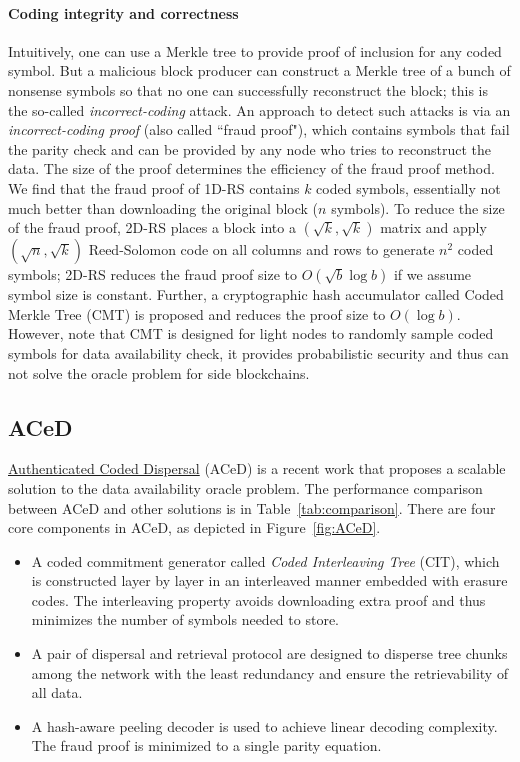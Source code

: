 \documentclass{article}
\begin{document}
\paragraph{Coding integrity and correctness} Intuitively, one can use a Merkle tree to provide proof of inclusion for any coded symbol. But a malicious block producer can construct a Merkle tree of a bunch of nonsense symbols so that no one can successfully reconstruct the block; this is the so-called {\em incorrect-coding} attack. An approach to detect such attacks is via an {\em incorrect-coding proof} (also called ``fraud proof"), which contains symbols that fail the parity check and can be provided by any node who tries to reconstruct the data.  The size of the proof determines the efficiency of the fraud proof method. We find that the fraud proof of 1D-RS contains $k$ coded symbols, essentially not much better than downloading the original block ($n$ symbols). To reduce the size of the fraud proof, 2D-RS \cite{al2018fraud} places a block into a $(\sqrt{k}, \sqrt{k})$ matrix and apply $(\sqrt{n},\sqrt{k})$ Reed-Solomon code on all columns and rows to generate $n^2$ coded symbols; 2D-RS reduces the fraud proof size to $O(\sqrt{b}\log b)$ if we assume symbol size is constant. Further, a cryptographic hash accumulator called Coded Merkle Tree (CMT) \cite{yu2020coded} is proposed and reduces the proof size to $O(\log b)$. However, note that CMT is designed for light nodes to randomly sample coded symbols for data availability check, it provides probabilistic security and thus can not solve the oracle problem for side blockchains.

\subsection*{ACeD}  \href{https://arxiv.org/abs/2011.00102}{Authenticated Coded Dispersal} (ACeD) is a recent work that proposes a scalable solution to the data availability oracle problem. The performance comparison between ACeD and other solutions is in Table~\ref{tab:comparison}. There are four core components in ACeD, as depicted in Figure~\ref{fig:ACeD}. 
     \begin{itemize}
         \item A coded commitment generator called {\em Coded Interleaving Tree}  (CIT), which is constructed layer by layer in an interleaved manner embedded with erasure codes. The interleaving property avoids downloading extra proof and thus minimizes the number of symbols needed to store. 
         \item A pair of dispersal and retrieval protocol are designed to disperse tree chunks among the network with the least redundancy and ensure the retrievability of all data. 
         \item A hash-aware peeling decoder is used to achieve linear decoding complexity. The fraud proof is minimized to a single parity equation.
     \end{itemize}
\end{document}
